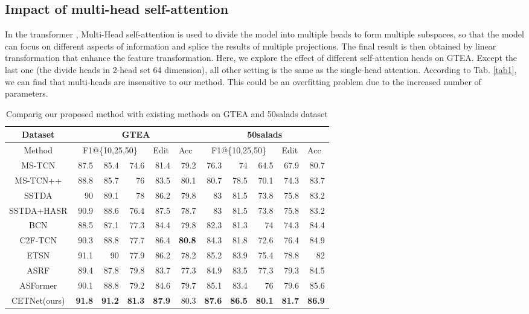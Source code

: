 \documentclass[runningheads]{llncs}
\begin{document}
\subsection{Impact of multi-head self-attention}
\par{
	In the transformer \cite{vaswani2017attention}, Multi-Head self-attention is used to divide the model into multiple heads to form multiple subspaces, so that the model can focus on different aspects of information and splice the results of multiple projections. The final result is then obtained by linear transformation that enhance the feature transformation. Here, we explore the effect of different self-attention heads on GTEA. Except the last one (the divide heads in 2-head set 64 dimension), all other setting is the same as the single-head attention. According to Tab. \ref{tab1}, we can find that multi-heads are insensitive to our method. This could be an overfitting problem due to the increased number of parameters.
}
\begin{table*}[htbp]
	\centering
	\caption{Comparig our proposed method with existing methods on GTEA and 50salads dataset}
\begin{tabular}{crrrrrrrrrr}
			\toprule
			Dataset & \multicolumn{5}{c}{GTEA}              & \multicolumn{5}{c}{50salads} \\
			\midrule
			Method & \multicolumn{3}{c}{F1@\{10,25,50\}} & \multicolumn{1}{l}{Edit} & \multicolumn{1}{l}{Acc} & \multicolumn{3}{c}{F1@\{10,25,50\}} & \multicolumn{1}{l}{Edit} & \multicolumn{1}{l}{Acc} \\
			\midrule
			MS-TCN\cite{farha2019ms} & 87.5  & 85.4  & 74.6  & 81.4  & 79.2  & 76.3  & 74    & 64.5  & 67.9  & 80.7 \\
			MS-TCN++\cite{li2020ms} & 88.8  & 85.7  & 76    & 83.5  & 80.1  & 80.7  & 78.5  & 70.1  & 74.3  & 83.7 \\
			SSTDA\cite{chen2020action} & 90    & 89.1  & 78    & 86.2  & 79.8  & 83    & 81.5  & 73.8  & 75.8  & 83.2 \\
			SSTDA+HASR\cite{ahn2021refining} & 90.9  & 88.6  & 76.4  & 87.5  & 78.7  & 83    & 81.5  & 73.8  & 75.8  & 83.2 \\
			BCN\cite{wang2020boundary}   & 88.5  & 87.1  & 77.3  & 84.4  & 79.8  & 82.3  & 81.3  & 74    & 74.3  & 84.4 \\
			C2F-TCN\cite{singhania2021coarse} & 90.3  & 88.8  & 77.7  & 86.4  & \textbf{80.8} & 84.3  & 81.8  & 72.6  & 76.4  & 84.9 \\
			ETSN\cite{li2021efficient} & 91.1  & 90    & 77.9  & 86.2  & 78.2  & 85.2  & 83.9  & 75.4  & 78.8  & 82 \\
			ASRF\cite{ishikawa2021alleviating} & 89.4  & 87.8  & 79.8  & 83.7  & 77.3  & 84.9  & 83.5  & 77.3  & 79.3  & 84.5 \\
			ASFormer\cite{yi2021asformer} & 90.1  & 88.8  & 79.2  & 84.6  & 79.7  & 85.1  & 83.4  & 76    & 79.6  & 85.6 \\
			CETNet(ours) & \textbf{91.8} & \textbf{91.2} & \textbf{81.3} & \textbf{87.9} & 80.3  & \textbf{87.6} & \textbf{86.5} & \textbf{80.1} & \textbf{81.7} & \textbf{86.9} \\
			\bottomrule
	\end{tabular}\label{table5}\end{table*}
\end{document}

